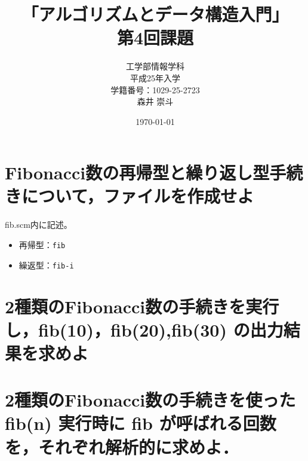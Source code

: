 \documentclass[a4paper,12pt]{article}
\begin{document}
\title{「アルゴリズムとデータ構造入門」\\
第4回課題}
\author{工学部情報学科\\
平成25年入学\\
学籍番号：1029-25-2723\\
森井 崇斗 }
\date{\today}
\maketitle

\lstset{numbers=left,basicstyle=\ttfamily\small,
  commentstyle=\textit, keywordstyle=\bfseries}

\section{ Fibonacci数の再帰型と繰り返し型手続きについて，ファイルを作成せよ}
fib.scm内に記述。\\
\begin{itemize}
    \item 再帰型：{\tt fib}
    \item 繰返型：{\tt fib-i}
\end{itemize}


\section{2種類のFibonacci数の手続きを実行し，fib(10)，fib(20),fib(30) の出力結果を求めよ}


\section{ 2種類のFibonacci数の手続きを使ったfib(n) 実行時に fib が呼ばれる回数を，それぞれ解析的に求めよ．}
\end{document}
